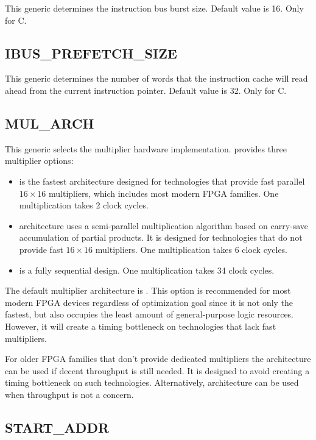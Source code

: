 \documentclass[a4paper,12pt,twoside,extrafontsizes]{memoir}
\begin{document}
This  generic determines the instruction bus burst size. Default value is 16. Only for \lxp{}C.

\subsection{IBUS\_PREFETCH\_SIZE}

This  generic determines the number of words that the instruction cache will read ahead from the current instruction pointer. Default value is 32. Only for \lxp{}C.

\subsection{MUL\_ARCH}

This  generic selects the multiplier hardware implementation. \lxp{} provides three multiplier options:

\begin{itemize}
	\item {} is the fastest architecture designed for technologies that provide fast parallel $16 \times 16$ multipliers, which includes most modern FPGA families. One multiplication takes 2 clock cycles.
	\item {} architecture uses a semi-parallel multiplication algorithm based on carry-save accumulation of partial products. It is designed for technologies that do not provide fast $16 \times 16$ multipliers. One multiplication takes 6 clock cycles.
	\item {} is a fully sequential design. One multiplication takes 34 clock cycles.
\end{itemize}

The default multiplier architecture is . This option is recommended for most modern FPGA devices regardless of optimization goal since it is not only the fastest, but also occupies the least amount of general-purpose logic resources. However, it will create a timing bottleneck on technologies that lack fast multipliers.

For older FPGA families that don't provide dedicated multipliers the  architecture can be used if decent throughput is still needed. It is designed to avoid creating a timing bottleneck on such technologies. Alternatively,  architecture can be used when throughput is not a concern.

\subsection{START\_ADDR}
\end{document}
